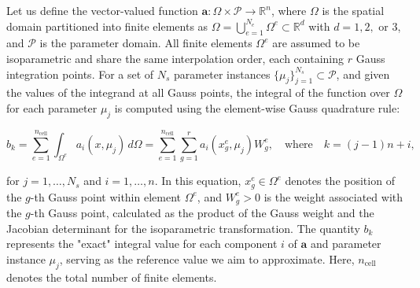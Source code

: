 \documentclass[11pt]{article}
\renewcommand{\vec}[1]{\mathbf{#1}}
\begin{document}
            Let us define the vector-valued function \(\vec{a}: \Omega \times \mathcal{P} \to \mathbb{R}^n\), where \(\Omega\) is the spatial domain partitioned into finite elements as \(\Omega = \bigcup_{e=1}^{N_e} \Omega^e \subset \mathbb{R}^d\) with \(d = 1, 2,\) or \(3\), and \(\mathcal{P}\) is the parameter domain.
            All finite elements \(\Omega^e\) are assumed to be isoparametric and share the same interpolation order, each containing \(r\) Gauss integration points.
            For a set of \(N_s\) parameter instances \(\{ \mu_j \}_{j=1}^{N_s} \subset \mathcal{P}\), and given the values of the integrand at all Gauss points, the integral of the function over \(\Omega\) for each parameter \(\mu_j\) is computed using the element-wise Gauss quadrature rule:


            \begin{equation}
            b_k = \sum_{e=1}^{n_{\text{cell}}} \int_{\Omega^e} a_i(x, \mu_j) \, d\Omega = \sum_{e=1}^{n_{\text{cell}}} \sum_{g=1}^{r} a_i(x_g^e, \mu_j) W_g^e, \quad \text{where} \quad k = (j-1)n + i,
            \end{equation}


            for \(j = 1, \ldots, N_s\) and \(i = 1, \ldots, n\).
            In this equation, \(x_g^e \in \Omega^e\) denotes the position of the \(g\)-th Gauss point within element \(\Omega^e\), and \(W_g^e > 0\) is the weight associated with the \(g\)-th Gauss point, calculated as the product of the Gauss weight and the Jacobian determinant for the isoparametric transformation.
            The quantity \(b_k\) represents the "exact" integral value for each component \(i\) of \(\vec{a}\) and parameter instance \(\mu_j\), serving as the reference value we aim to approximate.
            Here, \(n_{\text{cell}}\) denotes the total number of finite elements.
\end{document}
